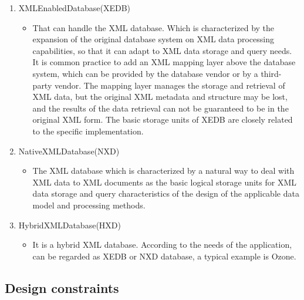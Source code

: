 \begin{enumerate}
    \item XMLEnabledDatabase(XEDB)
    \begin{itemize}
        \item That can handle the XML database. Which is characterized by the expansion of the original database system on XML data processing capabilities, so that it can adapt to XML data storage and query needs. It is common practice to add an XML mapping layer above the database system, which can be provided by the database vendor or by a third-party vendor. The mapping layer manages the storage and retrieval of XML data, but the original XML metadata and structure may be lost, and the results of the data retrieval can not be guaranteed to be in the original XML form. The basic storage units of XEDB are closely related to the specific implementation.
    \end{itemize}
    \item NativeXMLDatabase(NXD)
    \begin{itemize}
        \item The XML database which is characterized by a natural way to deal with XML data to XML documents as the basic logical storage units for XML data storage and query characteristics of the design of the applicable data model and processing methods.
    \end{itemize}
    \item HybridXMLDatabase(HXD)
    \begin{itemize}
        \item It is a hybrid XML database. According to the needs of the application, can be regarded as XEDB or NXD database, a typical example is Ozone.
    \end{itemize}
\end{enumerate}


\subsection{Design constraints}

